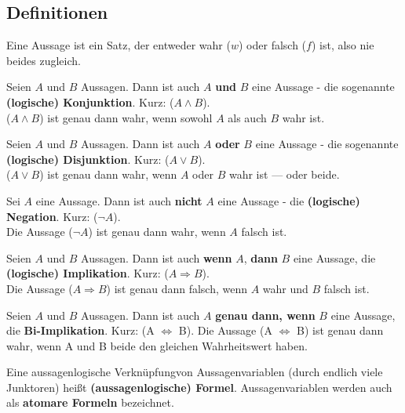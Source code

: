 \subsection*{Definitionen}
\vspace{-.4cm}
\begin{description}
  \setlength{\itemsep}{-.2cm}
  \item [Aussage:] 
    Eine Aussage ist ein Satz, der entweder wahr ($w$) oder falsch ($f$) ist, 
    also nie beides zugleich.
  
  \item [Konjunktion:] 
    Seien $A$ und $B$ Aussagen. Dann ist auch $A$ \textbf{und} $B$ eine Aussage
    - die sogenannte \textbf{(logische) Konjunktion}. Kurz: ($A \wedge B$). \\
    ($A \wedge B$) ist genau dann wahr, wenn sowohl $A$ als auch $B$ wahr ist.
  
  \item [Disjunktion:] 
    Seien $A$ und $B$ Aussagen. Dann ist auch $A$ \textbf{oder} $B$ eine Aussage
    - die sogenannte \textbf{(logische) Disjunktion}. Kurz: ($A \vee B$). \\
    ($A \vee B$) ist genau dann wahr, wenn $A$ oder $B$ wahr ist --- oder beide.
  
  \item [Negation:] 
    Sei $A$ eine Aussage. Dann ist auch \textbf{nicht} $A$ eine Aussage - die 
    \textbf{(logische) Negation}. Kurz: ($\neg A$). \\
    Die Aussage ($\neg A$) ist genau dann wahr, wenn $A$ falsch ist.
  
  \item [Implikation:] 
    Seien $A$ und $B$ Aussagen. Dann ist auch \textbf{wenn} $A$, \textbf{dann} 
    $B$ eine Aussage, die \textbf{(logische) Implikation}.
    Kurz: ($A \Rightarrow B$). \\
    Die Aussage ($A \Rightarrow B$) ist genau dann falsch, wenn $A$ wahr und $B$ 
    falsch ist.
  
  \item [Bi-Implikation:] 
    Seien $A$ und $B$ Aussagen. Dann ist auch $A$ \textbf{genau dann, wenn} 
    $B$ eine Aussage, die \textbf{Bi-Implikation}. Kurz: (A $\iff$ B). Die 
    Aussage (A $\iff$ B) ist genau dann wahr, wenn A und B beide den gleichen 
    Wahrheitswert haben.
  
  \item [Formel:] 
    Eine aussagenlogische Verknüpfungvon Aussagenvariablen (durch endlich viele 
    Junktoren) heißt \textbf{(aussagenlogische) Formel}. Aussagenvariablen 
    werden auch als \textbf{atomare Formeln} bezeichnet.


\end{description}

